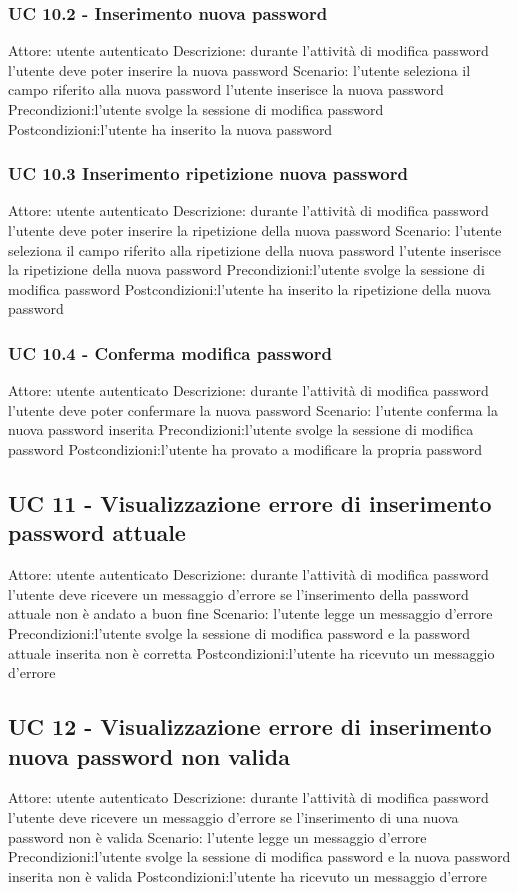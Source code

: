 \subsubsection{UC 10.2 - Inserimento nuova password}
Attore: utente autenticato
Descrizione: durante l’attività di modifica password l’utente deve poter inserire la nuova password
Scenario: 
l’utente seleziona il campo riferito alla nuova password
l’utente inserisce la nuova password 
Precondizioni:l’utente svolge la sessione di modifica password
Postcondizioni:l’utente ha inserito la nuova password 

\subsubsection{UC 10.3 Inserimento ripetizione nuova password}
Attore: utente autenticato
Descrizione: durante l’attività di modifica password l’utente deve poter inserire la ripetizione della nuova password
Scenario: 
l’utente seleziona il campo riferito alla ripetizione della nuova password
l’utente inserisce la ripetizione della nuova password 
Precondizioni:l’utente svolge la sessione di modifica password
Postcondizioni:l’utente ha inserito la ripetizione della nuova password 

\subsubsection{UC 10.4 - Conferma modifica password}
Attore: utente autenticato
Descrizione: durante l’attività di modifica password l’utente deve poter confermare la nuova password
Scenario: l’utente conferma la nuova password inserita
Precondizioni:l’utente svolge la sessione di modifica password
Postcondizioni:l’utente ha provato a modificare la propria password

\subsection{UC 11 - Visualizzazione errore di inserimento password attuale}
Attore: utente autenticato
Descrizione: durante l’attività di modifica password l’utente deve ricevere un messaggio d’errore se l'inserimento della password attuale non è andato a buon fine
Scenario: l’utente legge un messaggio d’errore
Precondizioni:l’utente svolge la sessione di modifica password e la password attuale inserita non è corretta
Postcondizioni:l’utente ha ricevuto un messaggio d’errore

\subsection{UC 12 - Visualizzazione errore di inserimento nuova password non valida}
Attore: utente autenticato
Descrizione: durante l’attività di modifica password l’utente deve ricevere un messaggio d’errore se l'inserimento di una nuova password non è valida
Scenario: l’utente legge un messaggio d’errore
Precondizioni:l’utente svolge la sessione di modifica password e la nuova password inserita non è valida
Postcondizioni:l’utente ha ricevuto un messaggio d’errore

